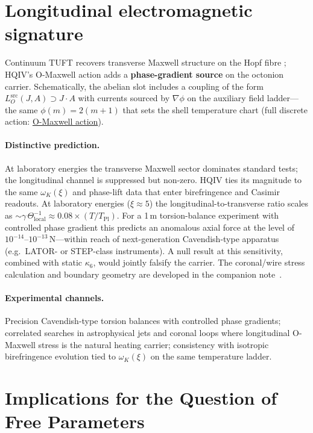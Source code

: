 \documentclass[11pt]{amsart}
\begin{document}
\section{Longitudinal electromagnetic signature}
\label{sec:longitudinal-em}

Continuum TUFT recovers transverse Maxwell structure on the Hopf fibre \cite{maxwell1865,jackson1999}; HQIV's O-Maxwell action adds a \textbf{phase-gradient source} on the octonion carrier. Schematically, the abelian slot includes a coupling of the form $L_O^{\mathrm{src}}(J,A)\supset J\cdot A$ with currents sourced by $\nabla\phi$ on the auxiliary field ladder---the same $\phi(m)=2(m+1)$ that sets the shell temperature chart (full discrete action: \hyperref[lean:omaxwell-action]{O-Maxwell action}).

\paragraph{Distinctive prediction.}
At laboratory energies the transverse Maxwell sector dominates standard tests; the longitudinal channel is suppressed but non-zero. HQIV ties its magnitude to the same $\omega_K(\xi)$ and phase-lift data that enter birefringence and Casimir readouts. At laboratory energies ($\xi \approx 5$) the longitudinal-to-transverse ratio scales as $\sim \gamma\,\Theta_{\mathrm{local}}^{-1} \approx 0.08\times(T/T_{\mathrm{Pl}})$. For a 1\,m torsion-balance experiment with controlled phase gradient this predicts an anomalous axial force at the level of $10^{-14}$--$10^{-13}\,\mathrm{N}$---within reach of next-generation Cavendish-type apparatus (e.g.\ LATOR- or STEP-class instruments). A null result at this sensitivity, combined with static $\kappa_6$, would jointly falsify the carrier. The coronal/wire stress calculation and boundary geometry are developed in the companion note~\cite{ettinger2026longitudinal}.

\paragraph{Experimental channels.}
Precision Cavendish-type torsion balances with controlled phase gradients; correlated searches in astrophysical jets and coronal loops where longitudinal O-Maxwell stress is the natural heating carrier; consistency with isotropic birefringence evolution tied to $\omega_K(\xi)$ on the same temperature ladder.

\section{Implications for the Question of Free Parameters}
\end{document}
